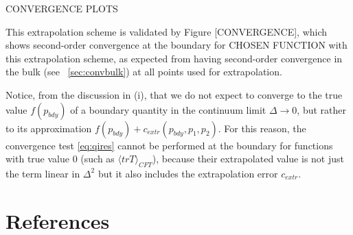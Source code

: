 \documentclass[a4paper,11pt]{article}
\begin{document}
CONVERGENCE PLOTS

This extrapolation scheme is validated by Figure [CONVERGENCE], which shows second-order convergence at the boundary for CHOSEN FUNCTION with this extrapolation scheme, as expected from having second-order convergence in the bulk (see ~\ref{sec:convbulk}) at all points used for extrapolation.


Notice, from the discussion in (i), that we do not expect to converge to the true value $f(p_{bdy})$ of a boundary quantity in the continuum limit $\Delta\rightarrow0$, but rather to its approximation $f(p_{bdy})+c_{extr}(p_{bdy},p_1,p_2)$.
For this reason, the convergence test \eqref{eq:qires} cannot be performed at the boundary for functions with true value 0 (such as $\langle trT \rangle_{CFT}$), because their extrapolated value is not just the term linear in $\Delta^2$ but it also includes the extrapolation error $c_{extr}$.

\section*{References}


\end{document}
